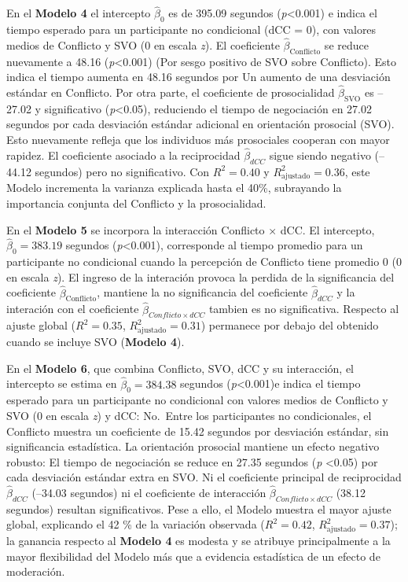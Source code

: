 \documentclass[
  spanish,
  10pt,
]{article}
\begin{document}
En el \textbf{Modelo 4} el intercepto \(\hat{\beta}_0\) es de 395.09
segundos (\emph{p}\textless0.001) e indica el tiempo esperado para un
participante no condicional (dCC = 0), con valores medios de Conflicto y
SVO (0 en escala \emph{z}). El coeficiente
\(\hat{\beta}_{\text{Conflicto}}\) se reduce nuevamente a 48.16
(\emph{p}\textless0.001) (Por sesgo positivo de SVO sobre Conflicto).
Esto indica el tiempo aumenta en 48.16 segundos por Un aumento de una
desviación estándar en Conflicto. Por otra parte, el coeficiente de
prosocialidad \(\hat{\beta}_{\text{SVO}}\) es --27.02 y significativo
(\emph{p}\textless0.05), reduciendo el tiempo de negociación en 27.02
segundos por cada desviación estándar adicional en orientación prosocial
(SVO). Esto nuevamente refleja que los individuos más prosociales
cooperan con mayor rapidez. El coeficiente asociado a la reciprocidad
\(\hat{\beta}_{dCC}\) sigue siendo negativo (--44.12 segundos) pero no
significativo. Con \(R^2 = 0.40\) y \(R^2_{\text{ajustado}} = 0.36\),
este Modelo incrementa la varianza explicada hasta el 40\%, subrayando
la importancia conjunta del Conflicto y la prosocialidad.

En el \textbf{Modelo 5} se incorpora la interacción Conflicto × dCC. El
intercepto, \(\hat{\beta}_0 = 383.19\) segundos
(\emph{p}\textless0.001), corresponde al tiempo promedio para un
participante no condicional cuando la percepción de Conflicto tiene
promedio 0 (0 en escala \emph{z}). El ingreso de la interación provoca
la perdida de la significancia del coeficiente
\(\hat{\beta}_{\text{Conflicto}}\), mantiene la no significancia del
coeficiente \(\hat{\beta}_{dCC}\) y la interación con el coeficiente
\(\hat{\beta}_{Conflicto \times dCC}\) tambien es no significativa.
Respecto al ajuste global (\(R^2 = 0.35\),
\(R^2_{\text{ajustado}} = 0.31\)) permanece por debajo del obtenido
cuando se incluye SVO (\textbf{Modelo 4}).

En el \textbf{Modelo 6}, que combina Conflicto, SVO, dCC y su
interacción, el intercepto se estima en \(\hat{\beta}_0 = 384.38\)
segundos (\emph{p}\textless0.001)e indica el tiempo esperado para un
participante no condicional con valores medios de Conflicto y SVO (0 en
escala \emph{z}) y dCC: No.~Entre los participantes no condicionales, el
Conflicto muestra un coeficiente de 15.42 segundos por desviación
estándar, sin significancia estadística. La orientación prosocial
mantiene un efecto negativo robusto: El tiempo de negociación se reduce
en 27.35 segundos (\emph{p} \textless0.05) por cada desviación estándar
extra en SVO. Ni el coeficiente principal de reciprocidad
\(\hat\beta_{dCC}\) (--34.03 segundos) ni el coeficiente de interacción
\(\hat{\beta}_{Conflicto \times dCC}\) (38.12 segundos) resultan
significativos. Pese a ello, el Modelo muestra el mayor ajuste global,
explicando el 42 \% de la variación observada (\(R^2 = 0.42\),
\(R^2_{\text{ajustado}} = 0.37\)); la ganancia respecto al
\textbf{Modelo 4} es modesta y se atribuye principalmente a la mayor
flexibilidad del Modelo más que a evidencia estadística de un efecto de
moderación.
\end{document}
